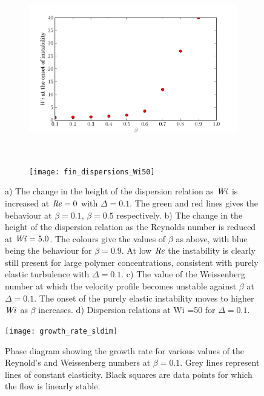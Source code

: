 \documentclass{jfm}
\newcommand\Wi{\mbox{\textit{Wi}}}
\newcommand\Rey{\mbox{\textit{Re}}}  %
\begin{document}
\begin{figure}
    \begin{subfigure}[b]{0.48\textwidth} 
	\centering
	\includegraphics[width=\textwidth]{KH_onset_beta_Wi} 
	\caption{}
	\label{fig:KH_elastic_onset} 
    \end{subfigure} ~
    \begin{subfigure}[b]{0.48\textwidth} 
	\centering
	\texttt{[image: fin\_dispersions\_Wi50]} 
	\caption{}
	\label{fig:KH_finite_dispersions} 
    \end{subfigure} 
    \caption{ 
	a) The change in the height of the dispersion relation as $\Wi$ is
	increased at $\Rey = 0$ with $\Delta = 0.1$. The green and red lines gives
	the behaviour at $\beta=0.1$, $\beta=0.5$ respectively. b) The change in
	the height of the dispersion relation as the Reynolds number is reduced at
	$\Wi=5.0$. The colours give the values of $\beta$ as above, with blue being
	the behaviour for $\beta=0.9$. At low $\Rey$ the instability is clearly
	still present for large polymer concentrations, consistent with purely
	elastic turbulence with $\Delta = 0.1$.  c) The value of the Weissenberg
	number at which the velocity profile becomes unstable against $\beta$ at
	$\Delta = 0.1$.  The onset of the purely elastic instability moves to
	higher $\Wi$ as $\beta$ increases. d) Dispersion relations at Wi =50 for
	$\Delta =0.1$.  
    }
\end{figure}


\begin{figure} 
    \centering
    \texttt{[image: growth\_rate\_sldim]} 
    \caption{ 
	Phase diagram showing the growth rate for various values of the
	Reynold's and Weissenberg numbers at $\beta=0.1$. Grey lines represent
	lines of constant elasticity. Black squares are data points for which
	the flow is linearly stable.  
    } 
    \label{fig:vary_Re_delta_conv} 
\end{figure}
\end{document}
